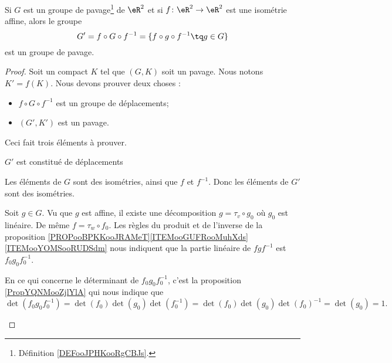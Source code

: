 \begin{proposition}      \label{PROPooPQYXooIDZlHy}
    Si \( G\) est un groupe de pavage\footnote{Définition \ref{DEFooJPHKooRgCBJs}.} de \( \eR^2\) et si \( f\colon \eR^2\to \eR^2\) est une isométrie affine, alors le groupe
    \begin{equation}
        G'=f\circ G\circ f^{-1}=\{f\circ g\circ f^{-1}\tq g\in G\}
    \end{equation}
    est un groupe de pavage.
\end{proposition}

\begin{proof}
    Soit un compact \( K\) tel que \( (G,K)\) soit un pavage. Nous notons \( K'=f(K)\). Nous devons prouver deux choses :
    \begin{itemize}
        \item \( f\circ G\circ f^{-1}\) est un groupe de déplacements;
        \item \( (G',K')\) est un pavage.
    \end{itemize}
    
    Ceci fait trois éléments à prouver.

    \begin{subproof}
        \item[\( G'\) est constitué de déplacements]

            Les éléments de \( G\) sont des isométries, ainsi que \( f\) et \( f^{-1}\). Donc les éléments de \( G'\) sont des isométries. 

            Soit \( g\in G\). Vu que \( g\) est affine, il existe une décomposition \( g=\tau_v\circ g_0\) où \( g_0\) est linéaire. De même \( f=\tau_w\circ f_0\). Les règles du produit et de l'inverse de la proposition \ref{PROPooBPKKooJRAMeT}\ref{ITEMooGUFRooMuhXds}\ref{ITEMooYOMSooRUDSdm} nous indiquent que la partie linéaire de \( fgf^{-1}\) est \( f_0g_0f_0^{-1}\).

            En ce qui concerne le déterminant de \( f_0g_0f_0^{-1}\), c'est la proposition \ref{PropYQNMooZjlYlA} qui nous indique que
            \begin{equation}
                \det(f_0g_0f_0^{-1})=\det(f_0)\det(g_0)\det(f_0^{-1})=\det(f_0)\det(g_0)\det(f_0)^{-1}=\det(g_0)=1.
            \end{equation}


\end{subproof}
\end{proof}
